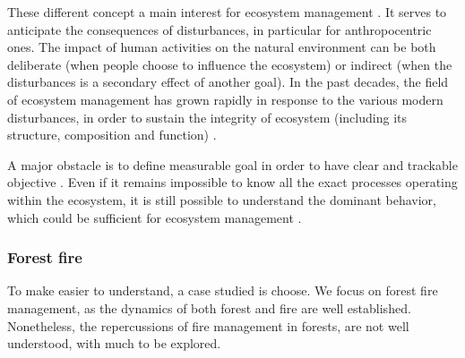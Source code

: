 \documentclass{article}
\begin{document}
These different concept a main interest for ecosystem management \cite{mumby2014ecological}. It serves to anticipate the consequences of disturbances, in particular for anthropocentric ones. The impact of human activities on the natural environment can be both deliberate (when people choose to influence the ecosystem) or indirect (when the disturbances is a secondary effect of another goal). 
In the past decades, the field of ecosystem management has grown rapidly \cite{grumbine1997reflections} in response to the various modern disturbances, in order to sustain the integrity of ecosystem (including its structure, composition and function) \cite{jensen1994overview}. 

A major obstacle is to define measurable goal in order to have clear and trackable objective \cite{slocombe1998defining}.
Even if it remains impossible to know all the exact processes operating within the ecosystem, it is still possible to understand the dominant behavior, which could be sufficient for ecosystem management \cite{mori2011ecosystem}\cite{slocombe1998defining}\cite{stanley1995ecosystem}. 


\subsubsection*{Forest fire}

To make easier to understand, a case studied is choose.
We focus on forest fire management, as the dynamics of both forest and fire are well established. Nonetheless, the repercussions of fire management in forests, are not well understood, with much to be explored.%
\end{document}
